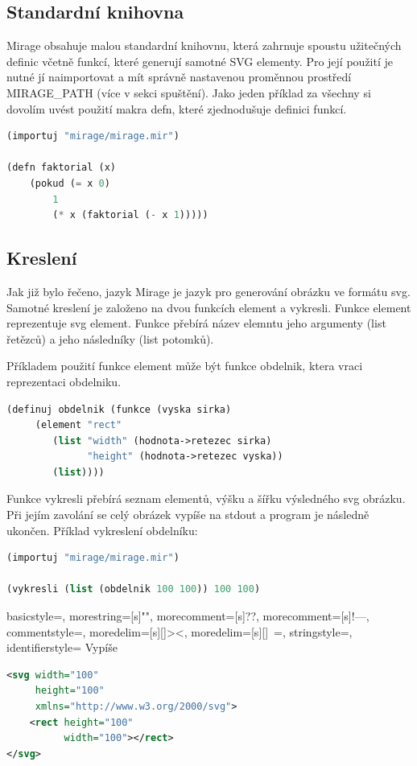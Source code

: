 \documentclass[a4paper,11pt]{article}
\begin{document}
\subsection{Standardní knihovna}
Mirage obsahuje malou standardní knihovnu, která zahrnuje spoustu užitečných definic včetně funkcí, které generují samotné SVG elementy. Pro její použití je nutné jí naimportovat a mít správně nastavenou proměnnou prostředí MIRAGE\_PATH (více v sekci spuštění). Jako jeden příklad za všechny si dovolím uvést použití makra defn, které zjednodušuje definici funkcí.

\begin{lstlisting}[language=lisp]
(importuj "mirage/mirage.mir")

(defn faktorial (x)
	(pokud (= x 0)
		1
		(* x (faktorial (- x 1)))))
\end{lstlisting}


\subsection{Kreslení}
Jak již bylo řečeno, jazyk Mirage je jazyk pro generování obrázku ve formátu svg. Samotné kreslení je založeno na dvou funkcích element a vykresli. Funkce element reprezentuje svg element. Funkce přebírá název elemntu jeho argumenty (list řetězců) a jeho následníky (list potomků).

Příkladem použití funkce element může být funkce obdelnik, ktera vraci reprezentaci obdelniku.

\begin{lstlisting}[language=lisp]
(definuj obdelnik (funkce (vyska sirka)
	 (element "rect" 
	 	(list "width" (hodnota->retezec sirka) 
	 	      "height" (hodnota->retezec vyska)) 
	 	(list))))
\end{lstlisting}
Funkce vykresli přebírá seznam elementů, výšku a šířku výsledného svg obrázku. Při jejím zavolání se celý obrázek vypíše na stdout a program je následně ukončen. Příklad vykreslení obdelníku:

\begin{lstlisting}[language=lisp]
(importuj "mirage/mirage.mir")

(vykresli (list (obdelnik 100 100)) 100 100)
\end{lstlisting}
{
  basicstyle=\ttfamily,
  morestring=[s]{"}{"},
  morecomment=[s]{?}{?},
  morecomment=[s]{!--}{--},
  commentstyle=\color{darkgreen},
  moredelim=[s][\color{black}]{>}{<},
  moredelim=[s][\color{red}]{\ }{=},
  stringstyle=\color{blue},
  identifierstyle=\color{maroon}
}
Vypíše 
\begin{lstlisting}[language=XML]
<svg width="100"
     height="100"
     xmlns="http://www.w3.org/2000/svg">     
	<rect height="100"
	      width="100"></rect>
</svg>
\end{lstlisting}
\end{document}
